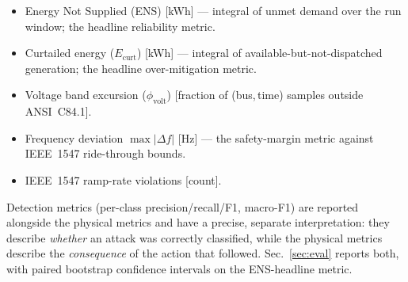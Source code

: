 \begin{itemize}
  \item Energy Not Supplied (ENS) [kWh] --- integral of unmet demand
    over the run window; the headline reliability metric.
  \item Curtailed energy ($E_{\mathrm{curt}}$) [kWh] --- integral of
    available-but-not-dispatched generation; the headline
    over-mitigation metric.
  \item Voltage band excursion ($\phi_{\mathrm{volt}}$) [fraction of
    (bus,\,time) samples outside ANSI~C84.1].
  \item Frequency deviation $\max|\Delta f|$ [Hz] --- the safety-margin
    metric against IEEE~1547 ride-through bounds.
  \item IEEE~1547 ramp-rate violations [count].
\end{itemize}
Detection metrics (per-class precision/recall/F1, macro-F1) are
reported alongside the physical metrics and have a precise, separate
interpretation: they describe \emph{whether} an attack was correctly
classified, while the physical metrics describe the
\emph{consequence} of the action that followed. Sec.~\ref{sec:eval}
reports both, with paired bootstrap confidence intervals on the
ENS-headline metric.
